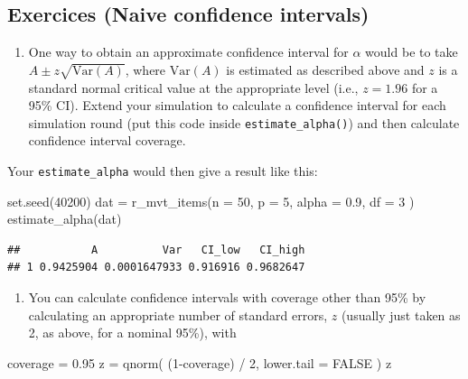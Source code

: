 \documentclass[
]{book}
\newenvironment{Shaded}{\begin{snugshade}}{\end{snugshade}}
\newcommand{\AttributeTok}[1]{\textcolor[rgb]{0.77,0.63,0.00}{#1}}
\newcommand{\ConstantTok}[1]{\textcolor[rgb]{0.00,0.00,0.00}{#1}}
\newcommand{\DecValTok}[1]{\textcolor[rgb]{0.00,0.00,0.81}{#1}}
\newcommand{\FloatTok}[1]{\textcolor[rgb]{0.00,0.00,0.81}{#1}}
\newcommand{\FunctionTok}[1]{\textcolor[rgb]{0.00,0.00,0.00}{#1}}
\newcommand{\NormalTok}[1]{#1}
\newcommand{\OtherTok}[1]{\textcolor[rgb]{0.56,0.35,0.01}{#1}}
\newcommand{\SpecialCharTok}[1]{\textcolor[rgb]{0.00,0.00,0.00}{#1}}
\providecommand{\tightlist}{%
  \setlength{\itemsep}{0pt}\setlength{\parskip}{0pt}}
\begin{document}
\hypertarget{exercices-naive-confidence-intervals}{%
\subsection{Exercices (Naive confidence intervals)}\label{exercices-naive-confidence-intervals}}

\begin{enumerate}
\def\labelenumi{\arabic{enumi}.}
\tightlist
\item
  One way to obtain an approximate confidence interval for \(\alpha\) would be to take \(A \pm z \sqrt{\text{Var}(A)}\), where \(\text{Var}(A)\) is estimated as described above and \(z\) is a standard normal critical value at the appropriate level (i.e., \(z = 1.96\) for a 95\% CI).
  Extend your simulation to calculate a confidence interval for each simulation round (put this code inside \texttt{estimate\_alpha()}) and then calculate confidence interval coverage.
\end{enumerate}

Your \texttt{estimate\_alpha} would then give a result like this:

\begin{Shaded}
\begin{Highlighting}[]
\FunctionTok{set.seed}\NormalTok{(}\DecValTok{40200}\NormalTok{)}
\NormalTok{dat }\OtherTok{=} \FunctionTok{r\_mvt\_items}\NormalTok{(}\AttributeTok{n =} \DecValTok{50}\NormalTok{, }\AttributeTok{p =} \DecValTok{5}\NormalTok{, }\AttributeTok{alpha =} \FloatTok{0.9}\NormalTok{, }\AttributeTok{df =} \DecValTok{3}\NormalTok{ )}
\FunctionTok{estimate\_alpha}\NormalTok{(dat)}
\end{Highlighting}
\end{Shaded}

\begin{verbatim}
##           A          Var   CI_low   CI_high
## 1 0.9425904 0.0001647933 0.916916 0.9682647
\end{verbatim}

\begin{enumerate}
\def\labelenumi{\arabic{enumi}.}
\setcounter{enumi}{1}
\tightlist
\item
  You can calculate confidence intervals with coverage other than 95\% by calculating an appropriate number of standard errors, \(z\) (usually just taken as 2, as above, for a nominal 95\%), with
\end{enumerate}

\begin{Shaded}
\begin{Highlighting}[]
\NormalTok{coverage }\OtherTok{=} \FloatTok{0.95}
\NormalTok{z }\OtherTok{=} \FunctionTok{qnorm}\NormalTok{( (}\DecValTok{1}\SpecialCharTok{{-}}\NormalTok{coverage) }\SpecialCharTok{/} \DecValTok{2}\NormalTok{, }\AttributeTok{lower.tail =} \ConstantTok{FALSE}\NormalTok{ )}
\NormalTok{z}
\end{Highlighting}
\end{Shaded}
\end{document}
